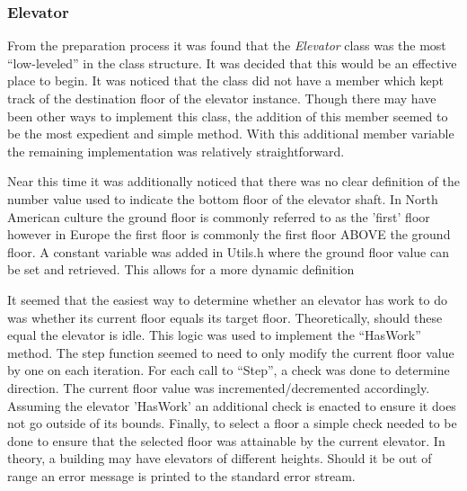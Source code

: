 \documentclass{article}
\begin{document}
\subsubsection{Elevator}
From the preparation process it was found that the \textit{Elevator} class was the most ``low-leveled'' in the class structure.
It was decided that this would be an effective place to begin.
It was noticed that the class did not have a member which kept track of the destination floor of the elevator instance.
Though there may have been other ways to implement this class, the addition of this member seemed to be the most expedient and simple method.
With this additional member variable the remaining implementation was relatively straightforward.

Near this time it was additionally noticed that there was no clear definition of the number value used to indicate the bottom floor of the elevator shaft.
In North American culture the ground floor is commonly referred to as the 'first' floor however in Europe the first floor is commonly the first floor ABOVE the ground floor.
A constant variable was added in Utils.h where the ground floor value can be set and retrieved.
This allows for a more dynamic definition\newline

It seemed that the easiest way to determine whether an elevator has work to do was whether its current floor equals its target floor.
Theoretically, should these equal the elevator is idle.
This logic was used to implement the ``HasWork'' method.
The step function seemed to need to only modify the current floor value by one on each iteration.
For each call to ``Step'', a check was done to determine direction.
The current floor value was incremented/decremented accordingly.
Assuming the elevator 'HasWork' an additional check is enacted to ensure it does not go outside of its bounds.
Finally, to select a floor a simple check needed to be done to ensure that the selected floor was attainable by the current elevator. 
In theory, a building may have elevators of different heights.
Should it be out of range an error message is printed to the standard error stream.
\end{document}
